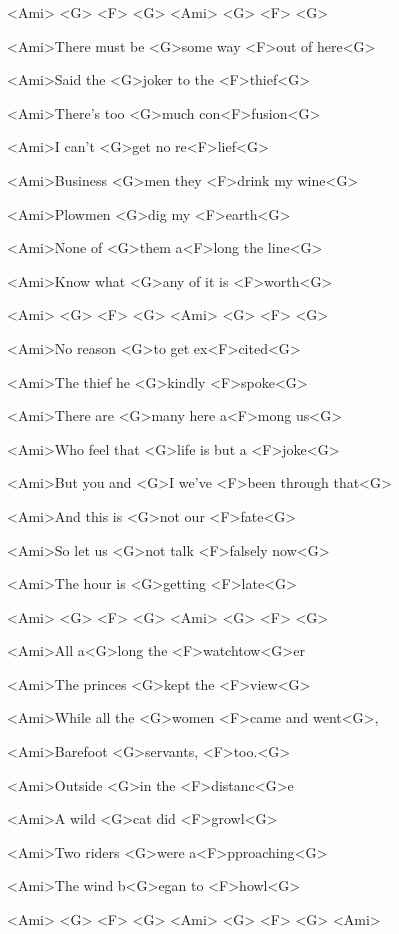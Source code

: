 

<Ami> <G> <F> <G>
<Ami> <G> <F> <G>

\zs
<Ami>There must be <G>some way <F>out of here<G>

<Ami>Said the <G>joker to the <F>thief<G>

<Ami>There's too <G>much con<F>fusion<G>

<Ami>I can't <G>get no re<F>lief<G>

<Ami>Business <G>men they <F>drink my wine<G>

<Ami>Plowmen <G>dig my <F>earth<G>

<Ami>None of <G>them a<F>long the line<G>

<Ami>Know what <G>any of it is <F>worth<G>
\ks

<Ami> <G> <F> <G>
<Ami> <G> <F> <G>

\zs
<Ami>No reason <G>to get ex<F>cited<G>

<Ami>The thief he <G>kindly <F>spoke<G>

<Ami>There are <G>many here a<F>mong us<G>

<Ami>Who feel that <G>life is but a <F>joke<G>

<Ami>But you and <G>I we've <F>been through that<G>

<Ami>And this is <G>not our <F>fate<G>

<Ami>So let us <G>not talk <F>falsely now<G>

<Ami>The hour is <G>getting <F>late<G>
\ks

<Ami> <G> <F> <G>
<Ami> <G> <F> <G>

\zs
<Ami>All a<G>long the <F>watchtow<G>er

<Ami>The princes <G>kept the <F>view<G>

<Ami>While all the <G>women <F>came and went<G>,

<Ami>Barefoot <G>servants, <F>too.<G>

<Ami>Outside <G>in the <F>distanc<G>e

<Ami>A wild <G>cat did <F>growl<G>

<Ami>Two riders <G>were a<F>pproaching<G>

<Ami>The wind b<G>egan to <F>howl<G>
\ks

<Ami> <G> <F> <G>
<Ami> <G> <F> <G>
<Ami>

\kp
